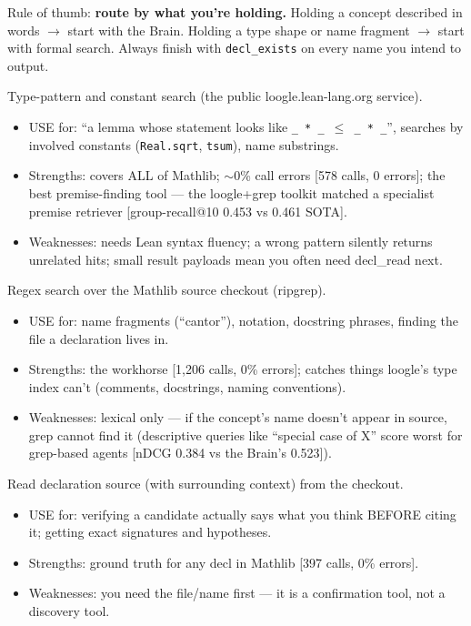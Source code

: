 \documentclass[10pt]{article}
\newcommand{\code}[1]{\texttt{#1}}
\begin{document}
Rule of thumb: \textbf{route by what you're holding.} Holding a concept
described in words $\to$ start with the Brain. Holding a type shape or
name fragment $\to$ start with formal search. Always finish with
\code{decl\_exists} on every name you intend to output.


Type-pattern and constant search (the public loogle.lean-lang.org
service).
\begin{itemize}
\item USE for: ``a lemma whose statement looks like
  \code{\_ * \_ $\leq$ \_ * \_}'', searches by involved constants
  (\code{Real.sqrt}, \code{tsum}), name substrings.
\item Strengths: covers ALL of Mathlib; $\sim$0\% call errors [578
  calls, 0 errors]; the best premise-finding tool --- the loogle+grep
  toolkit matched a specialist premise retriever [group-recall@10 0.453
  vs 0.461 SOTA].
\item Weaknesses: needs Lean syntax fluency; a wrong pattern silently
  returns unrelated hits; small result payloads mean you often need
  decl\_read next.
\end{itemize}

Regex search over the Mathlib source checkout (ripgrep).
\begin{itemize}
\item USE for: name fragments (``cantor''), notation, docstring
  phrases, finding the file a declaration lives in.
\item Strengths: the workhorse [1,206 calls, 0\% errors]; catches
  things loogle's type index can't (comments, docstrings, naming
  conventions).
\item Weaknesses: lexical only --- if the concept's name doesn't appear
  in source, grep cannot find it (descriptive queries like ``special
  case of X'' score worst for grep-based agents [nDCG 0.384 vs the
  Brain's 0.523]).
\end{itemize}

Read declaration source (with surrounding context) from the checkout.
\begin{itemize}
\item USE for: verifying a candidate actually says what you think
  BEFORE citing it; getting exact signatures and hypotheses.
\item Strengths: ground truth for any decl in Mathlib [397 calls, 0\%
  errors].
\item Weaknesses: you need the file/name first --- it is a confirmation
  tool, not a discovery tool.
\end{itemize}
\end{document}
